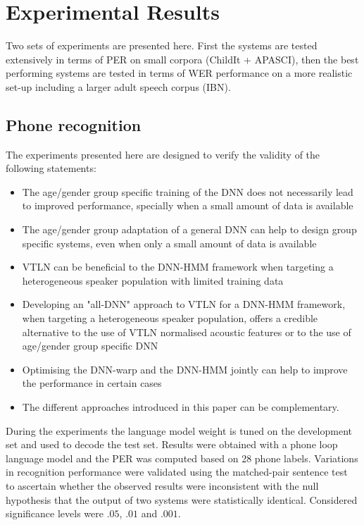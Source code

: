 \documentclass{nle}
\begin{document}
\section{Experimental Results}\label{section:expR}
Two sets of experiments are presented here. First the systems are tested extensively in terms of PER on small corpora (ChildIt + APASCI), then the best performing systems are tested in terms of WER performance on a more realistic set-up including a larger adult speech corpus (IBN).
\subsection{Phone recognition}

The experiments presented here are designed to verify the validity of the following statements:

\begin{itemize}
 \item The age/gender group specific training of the DNN does not necessarily lead to improved performance, specially when a small amount of data is available
 \item The age/gender group adaptation of a general DNN can help to design group specific systems, even when only a small amount of data is available
 \item VTLN can be beneficial to the DNN-HMM framework when targeting 
a heterogeneous speaker population with limited training data
 \item Developing an "all-DNN" approach to VTLN for a DNN-HMM framework, when targeting a heterogeneous speaker population, offers a credible alternative to the use of VTLN normalised acoustic features or to the use of age/gender group specific DNN
 \item Optimising the DNN-warp and the DNN-HMM jointly can help to improve the performance in certain cases
 \item The different approaches introduced in this paper can be complementary.

\end{itemize}
During the experiments the language model weight is tuned on the development set and used to decode the test set.  Results were obtained with a phone loop language model and the PER was  computed based on 28 phone labels. Variations  in recognition performance were  validated using the
matched-pair  sentence test~\citep*{GilCox89}  to ascertain  whether the
observed results  were inconsistent with the null  hypothesis that the
output  of  two  systems  were  statistically  identical.   Considered
significance levels were $.05$, $.01$ and $.001$.
\end{document}
